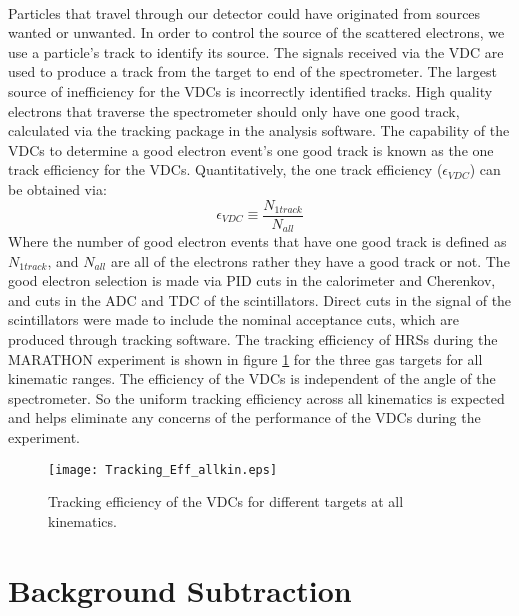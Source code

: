 \paragraph{}Particles that travel through our detector could have originated from sources wanted or unwanted. In order to control the source of the scattered electrons, we use a particle's track to identify its source. The signals received via the VDC are used to produce a track from the target to end of the spectrometer. The largest source of inefficiency for the VDCs is incorrectly identified tracks. High quality electrons that traverse the spectrometer should only have one good track, calculated via the tracking package in the analysis software. The capability of the VDCs to determine a good electron event's one good track is known as the one track efficiency for the VDCs. Quantitatively, the one track efficiency ($\epsilon_{VDC}$) can be obtained via:
\begin{equation}
\epsilon_{VDC} \equiv \frac{N_{1 track} }{N_{all}}
\end{equation}
Where the number of good electron events that have one good track is defined as $N_{1 track}$, and $N_{all}$ are all of the electrons rather they have a good track or not. The good electron selection is made via PID cuts in the calorimeter and Cherenkov, and cuts in the ADC and TDC of the scintillators. Direct cuts in the signal of the scintillators were made to include the nominal acceptance cuts, which are produced through tracking software. The tracking efficiency of HRSs during the MARATHON experiment is shown in figure \ref{trackeff} for the three gas targets for all kinematic ranges. The efficiency of the VDCs is independent of the angle of the spectrometer. So the uniform tracking efficiency across all kinematics is expected and helps eliminate any concerns of the performance of the VDCs during the experiment. 
\begin{figure}[t]
	\centering
	\texttt{[image: Tracking\_Eff\_allkin.eps]}
	\caption{Tracking efficiency of the VDCs for different targets at all kinematics. }
	\label{trackeff}
\end{figure}


\section{Background Subtraction}\label{sec:BG}
